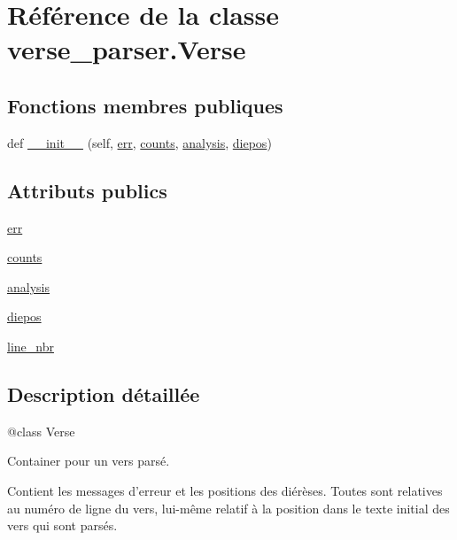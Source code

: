 \hypertarget{classverse__parser_1_1_verse}{}\section{Référence de la classe verse\+\_\+parser.\+Verse}
\label{classverse__parser_1_1_verse}
\subsection*{Fonctions membres publiques}
\begin{DoxyCompactItemize}
\item 
def \hyperlink{classverse__parser_1_1_verse_a397da952ec7b628b324ce160c4a1ce87}{\+\_\+\+\_\+init\+\_\+\+\_\+} (self, \hyperlink{classverse__parser_1_1_verse_a8da23437b64c64b33f4d9415678a1934}{err}, \hyperlink{classverse__parser_1_1_verse_a8553bca345c6d0e5ffb9da1367f7fcfc}{counts}, \hyperlink{classverse__parser_1_1_verse_a4f8f3107911abe117e0105860cf1f667}{analysis}, \hyperlink{classverse__parser_1_1_verse_a5227bfe71e85077a51471157a8693c37}{diepos})
\end{DoxyCompactItemize}
\subsection*{Attributs publics}
\begin{DoxyCompactItemize}
\item 
\hyperlink{classverse__parser_1_1_verse_a8da23437b64c64b33f4d9415678a1934}{err}
\item 
\hyperlink{classverse__parser_1_1_verse_a8553bca345c6d0e5ffb9da1367f7fcfc}{counts}
\item 
\hyperlink{classverse__parser_1_1_verse_a4f8f3107911abe117e0105860cf1f667}{analysis}
\item 
\hyperlink{classverse__parser_1_1_verse_a5227bfe71e85077a51471157a8693c37}{diepos}
\item 
\hyperlink{classverse__parser_1_1_verse_affbfce8897c2deb023524050b3fe5a83}{line\+\_\+nbr}
\end{DoxyCompactItemize}


\subsection{Description détaillée}
\begin{DoxyVerb}@class Verse

Container pour un vers parsé.

Contient les messages d'erreur et les positions des diérèses. Toutes sont
relatives au numéro de ligne du vers, lui-même relatif à la position
dans le texte initial des vers qui sont parsés.
\end{DoxyVerb}
 

